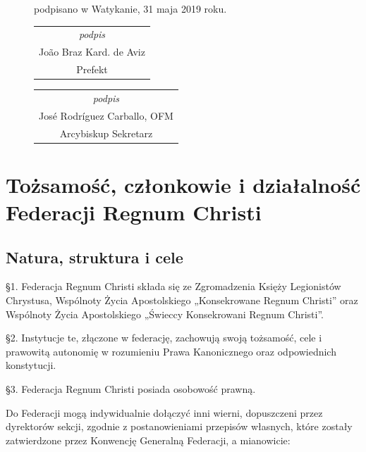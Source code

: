 \begin{figure}
\begin{framed}
\begin{footnotesize}
\begin{center}
podpisano w Watykanie, 31 maja 2019 roku.
\end{center}
 
\hfill\begin{tabular}{c}
{\em podpis} \\
João Braz Kard. de Aviz \\
Prefekt
\end {tabular}


\begin{tabular}{c}
{\em podpis} \\
José Rodríguez Carballo, OFM\\
Arcybiskup Sekretarz 
\end{tabular}
 
\end{footnotesize}
\end{framed}
\end{figure}






\part{Tożsamość, członkowie i działalność\\Federacji Regnum Christi}


\chapter{Natura, struktura i cele}




 \S{}1. Federacja Regnum Christi składa się ze Zgromadzenia Księży Legionistów Chrystusa, Wspólnoty Życia Apostolskiego „Konsekrowane Regnum Christi” oraz Wspólnoty Życia Apostolskiego „Świeccy Konsekrowani Regnum Christi”.


\S{}2. Instytucje te, złączone w federację, zachowują swoją tożsamość, cele i prawowitą autonomię w rozumieniu Prawa Kanonicznego oraz odpowiednich konstytucji.


\S{}3. Federacja Regnum Christi posiada osobowość prawną. 




 Do Federacji mogą indywidualnie dołączyć inni wierni, dopuszczeni przez dyrektorów sekcji, zgodnie z postanowieniami przepisów własnych, które zostały zatwierdzone przez Konwencję Generalną Federacji, a mianowicie:


